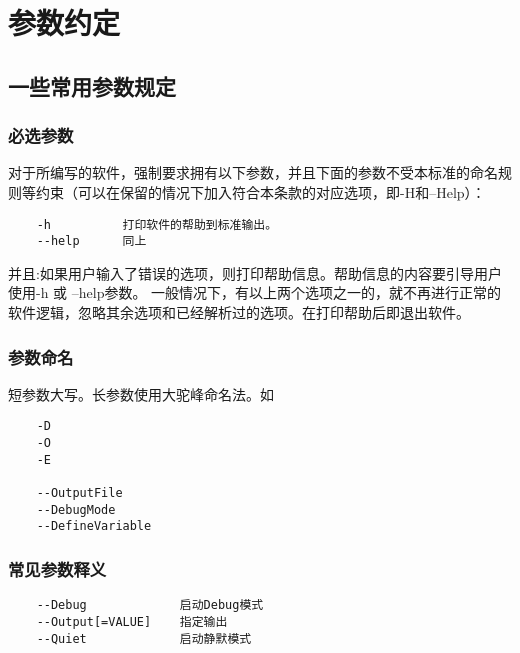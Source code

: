 \chapter{参数约定}

\section{一些常用参数规定}

\subsection{必选参数}

对于所编写的软件，强制要求拥有以下参数，并且下面的参数不受本标准的命名规则等约束（可以在保留的情况下加入符合本条款的对应选项，即-H和--Help）：
\begin{lstlisting}
	-h			打印软件的帮助到标准输出。
	--help 		同上
\end{lstlisting}
并且:如果用户输入了错误的选项，则打印帮助信息。帮助信息的内容要引导用户使用-h 或 --help参数。
一般情况下，有以上两个选项之一的，就不再进行正常的软件逻辑，忽略其余选项和已经解析过的选项。在打印帮助后即退出软件。

\subsection{参数命名}
短参数大写。长参数使用大驼峰命名法。如
\begin{lstlisting}
	-D
	-O
	-E
	
	--OutputFile
	--DebugMode
	--DefineVariable
\end{lstlisting}



\subsection{常见参数释义}
\begin{lstlisting}
	--Debug				启动Debug模式
	--Output[=VALUE]	指定输出
	--Quiet				启动静默模式
\end{lstlisting}

